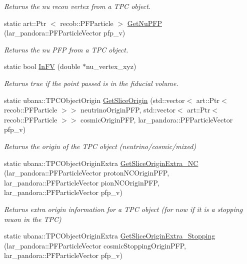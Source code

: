 \begin{DoxyCompactItemize}
\begin{DoxyCompactList}\small\item\em \-Returns the nu recon vertex from a \-T\-P\-C object. \end{DoxyCompactList}\item 
static art\-::\-Ptr\*
$<$ recob\-::\-P\-F\-Particle $>$ \hyperlink{classUBXSecHelper_a1803584104e1b6f618fe86b28aec1927}{\-Get\-Nu\-P\-F\-P} (lar\-\_\-pandora\-::\-P\-F\-Particle\-Vector pfp\-\_\-v)
\begin{DoxyCompactList}\small\item\em \-Returns the nu \-P\-F\-P from a \-T\-P\-C object. \end{DoxyCompactList}\item 
static bool \hyperlink{classUBXSecHelper_a4ff7e0d6774d5628cc2a3d19bb2d3492}{\-In\-F\-V} (double $\ast$nu\-\_\-vertex\-\_\-xyz)
\begin{DoxyCompactList}\small\item\em \-Returns true if the point passed is in the fiducial volume. \end{DoxyCompactList}\item 
static ubana\-::\-T\-P\-C\-Object\-Origin \hyperlink{classUBXSecHelper_a7f4a880c5880a678c7d0f181e92cb748}{\-Get\-Slice\-Origin} (std\-::vector$<$ art\-::\-Ptr$<$ recob\-::\-P\-F\-Particle $>$$>$ neutrino\-Origin\-P\-F\-P, std\-::vector$<$ art\-::\-Ptr$<$ recob\-::\-P\-F\-Particle $>$$>$ cosmic\-Origin\-P\-F\-P, lar\-\_\-pandora\-::\-P\-F\-Particle\-Vector pfp\-\_\-v)
\begin{DoxyCompactList}\small\item\em \-Returns the origin of the \-T\-P\-C object (neutrino/cosmic/mixed) \end{DoxyCompactList}\item 
static ubana\-::\-T\-P\-C\-Object\-Origin\-Extra \hyperlink{classUBXSecHelper_afe28141046a637997685e43478ea6e25}{\-Get\-Slice\-Origin\-Extra\-\_\-\-N\-C} (lar\-\_\-pandora\-::\-P\-F\-Particle\-Vector proton\-N\-C\-Origin\-P\-F\-P, lar\-\_\-pandora\-::\-P\-F\-Particle\-Vector pion\-N\-C\-Origin\-P\-F\-P, lar\-\_\-pandora\-::\-P\-F\-Particle\-Vector pfp\-\_\-v)
\begin{DoxyCompactList}\small\item\em \-Returns extra origin information for a \-T\-P\-C object (for now if it is a stopping muon in the \-T\-P\-C) \end{DoxyCompactList}\item 
static ubana\-::\-T\-P\-C\-Object\-Origin\-Extra \hyperlink{classUBXSecHelper_ae4071096536a66ccd1de84b8cc15fb12}{\-Get\-Slice\-Origin\-Extra\-\_\-\-Stopping} (lar\-\_\-pandora\-::\-P\-F\-Particle\-Vector cosmic\-Stopping\-Origin\-P\-F\-P, lar\-\_\-pandora\-::\-P\-F\-Particle\-Vector pfp\-\_\-v)

\end{DoxyCompactItemize}
